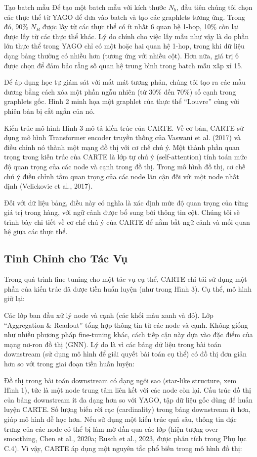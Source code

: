 \documentclass{article}
\begin{document}
Tạo batch mẫu
Để tạo một batch mẫu với kích thước $N_b$, đầu tiên chúng tôi chọn các thực thể từ YAGO để đưa vào batch và tạo các graphlets tương ứng. Trong đó, 90\% $N_B$ được lấy từ các thực thể có ít nhất 6 quan hệ 1-hop, 10\% còn lại được lấy từ các thực thể khác. Lý do chính cho việc lấy mẫu như vậy là do phần lớn thực thể trong YAGO chỉ có một hoặc hai quan hệ 1-hop, trong khi dữ liệu dạng bảng thường có nhiều hơn (tương ứng với nhiều cột). Hơn nữa, giá trị 6 được chọn để đảm bảo rằng số quan hệ trung bình trong batch mẫu xấp xỉ 15.

Để áp dụng học tự giám sát với mất mát tương phản, chúng tôi tạo ra các mẫu dương bằng cách xóa một phần ngẫu nhiên (từ 30\% đến 70\%) số cạnh trong graphlets gốc. Hình 2 minh họa một graphlet của thực thể “Louvre” cùng với phiên bản bị cắt ngắn của nó.

Kiến trúc mô hình
Hình 3 mô tả kiến trúc của CARTE. Về cơ bản, CARTE sử dụng mô hình Transformer encoder truyền thống của Vaswani et al. (2017) và điều chỉnh nó thành một mạng đồ thị với cơ chế chú ý. Một thành phần quan trọng trong kiến trúc của CARTE là lớp tự chú ý (self-attention) tính toán mức độ quan trọng của các node và cạnh trong đồ thị. Trong mô hình đồ thị, cơ chế chú ý điều chỉnh tầm quan trọng của các node lân cận đối với một node nhất định (Velickovic et al., 2017).

Đối với dữ liệu bảng, điều này có nghĩa là xác định mức độ quan trọng của từng giá trị trong hàng, với ngữ cảnh được bổ sung bởi thông tin cột. Chúng tôi sẽ trình bày chi tiết về cơ chế chú ý của CARTE để nắm bắt ngữ cảnh và mối quan hệ giữa các thực thể.


\subsection{Tinh Chỉnh cho Tác Vụ}
Trong quá trình fine-tuning cho một tác vụ cụ thể, CARTE chỉ tái sử dụng một phần của kiến trúc đã được tiền huấn luyện (như trong Hình 3). Cụ thể, mô hình giữ lại:

Các lớp ban đầu xử lý node và cạnh (các khối màu xanh và đỏ).
Lớp “Aggregation \& Readout” tổng hợp thông tin từ các node và cạnh.
Không giống như nhiều phương pháp fine-tuning khác, cách tiếp cận này dựa vào đặc điểm của mạng nơ-ron đồ thị (GNN). Lý do là vì các bảng dữ liệu trong bài toán downstream (sử dụng mô hình để giải quyết bài toán cụ thể) có đồ thị đơn giản hơn so với trong giai đoạn tiền huấn luyện:

Đồ thị trong bài toán downstream có dạng ngôi sao (star-like structure, xem Hình 1), tức là một node trung tâm liên kết với các node còn lại.
Cấu trúc đồ thị của bảng downstream ít đa dạng hơn so với YAGO, tập dữ liệu gốc dùng để huấn luyện CARTE.
Số lượng biến rời rạc (cardinality) trong bảng downstream ít hơn, giúp mô hình dễ học hơn.
Nếu sử dụng một kiến trúc quá sâu, thông tin đặc trưng của các node có thể bị làm mờ dần qua các lớp (hiện tượng over-smoothing, Chen et al., 2020a; Rusch et al., 2023, được phân tích trong Phụ lục C.4). Vì vậy, CARTE áp dụng một nguyên tắc phổ biến trong mô hình đồ thị:
\end{document}
